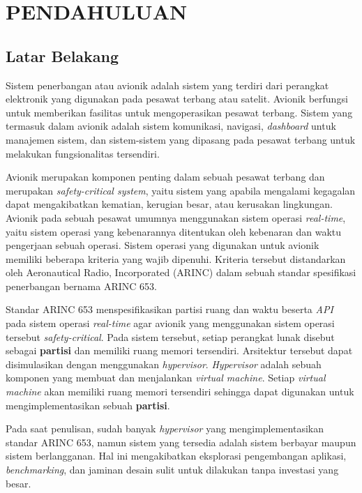 \chapter{PENDAHULUAN}

\section{Latar Belakang}

Sistem penerbangan atau avionik adalah sistem yang terdiri dari perangkat elektronik yang digunakan pada pesawat terbang
atau satelit. Avionik berfungsi untuk memberikan fasilitas untuk mengoperasikan pesawat terbang. Sistem yang termasuk
dalam avionik adalah sistem komunikasi, navigasi, \textit{dashboard} untuk manajemen sistem, dan sistem-sistem yang
dipasang pada pesawat terbang untuk melakukan fungsionalitas tersendiri.

Avionik merupakan komponen penting dalam sebuah pesawat terbang dan merupakan \textit{safety-critical system}, yaitu
sistem yang apabila mengalami kegagalan dapat mengakibatkan kematian, kerugian besar, atau kerusakan lingkungan. Avionik
pada sebuah pesawat umumnya menggunakan sistem operasi \textit{real-time}, yaitu sistem operasi yang kebenarannya
ditentukan oleh kebenaran dan waktu pengerjaan sebuah operasi. Sistem operasi yang digunakan untuk avionik memiliki
beberapa kriteria yang wajib dipenuhi. Kriteria tersebut distandarkan oleh Aeronautical Radio, Incorporated (ARINC)
dalam sebuah standar spesifikasi penerbangan bernama ARINC 653.

Standar ARINC 653 menspesifikasikan partisi ruang dan waktu beserta \textit{API} pada sistem operasi \textit{real-time} agar avionik yang
menggunakan sistem operasi tersebut \textit{safety-critical}. Pada sistem tersebut, setiap perangkat lunak disebut
sebagai \textbf{partisi} dan memiliki ruang memori tersendiri. Arsitektur tersebut dapat disimulasikan dengan
menggunakan \textit{hypervisor}. \textit{Hypervisor} adalah sebuah komponen yang membuat dan menjalankan \textit{virtual
machine}. Setiap \textit{virtual machine} akan memiliki ruang memori tersendiri sehingga dapat digunakan untuk
mengimplementasikan sebuah \textbf{partisi}.

Pada saat penulisan, sudah banyak \textit{hypervisor} yang mengimplementasikan standar ARINC 653, namun sistem yang
tersedia adalah sistem berbayar maupun sistem berlangganan. Hal ini mengakibatkan eksplorasi pengembangan aplikasi,
\textit{benchmarking}, dan jaminan desain sulit untuk dilakukan tanpa investasi yang besar.

